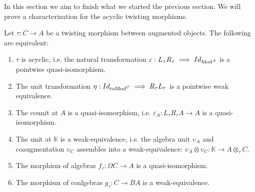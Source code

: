 \documentclass[../thesis.tex]{subfiles}
\begin{document}
            In this section we aim to finish what we started the previous section. We will prove a characterization for the acyclic twisting morphisms.

            \begin{thm}\label{thm: thm-twist}
                Let $\tau : C \rightarrow A$ be a twisting morphism between augmented objects. The following are equivalent:
                \begin{enumerate}
                    \item $\tau$ is acyclic, i.e. the natural transformation $\varepsilon : L_\tau R_\tau \implies Id_{\tt{Mod}^A}$ is a pointwise quasi-isomorphism.
                    \item The unit transformation $\eta : Id_{\tt{coMod}^C} \implies R_\tau L_\tau$ is a pointwise weak equivalence.
                    \item The counit at $A$ is a quasi-isomorphism, i.e. $\varepsilon_A : L_\tau R_\tau A \rightarrow A$ is a quasi-isomorphism.
                    \item The unit at $\mathbb{K}$ is a weak-equivalence, i.e. the algebra unit $\upsilon_A$ and coaugmentation $\upsilon_C$ assembles into a weak-equivalence: $\upsilon_A \otimes \upsilon_C : \mathbb{K} \rightarrow A \otimes_\tau C$.
                    \item The morphism of algebras $f_\tau : \Omega C \rightarrow A$ is a quasi-isomorphism.
                    \item The morphism of coalgebras $g_\tau : C \rightarrow BA$ is a weak-equivalence.
                \end{enumerate}
            \end{thm}
\end{document}
